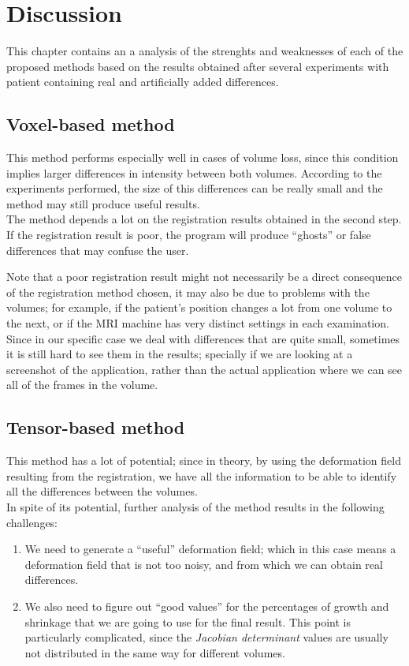 \chapter{Discussion}
This chapter contains an a analysis of the strenghts and weaknesses
of each of the proposed methods based on the results obtained after
several experiments with patient containing real and artificially
added differences.

\section{Voxel-based method}
This method performs especially well in cases of volume loss, since
this condition implies larger differences in intensity between both
volumes. According to the experiments performed, the size of this
differences can be really small and the method may still produce
useful results.\\

The method depends a lot on the registration results obtained in the
second step. If the registration result is poor, the program will
produce ``ghosts'' or false differences that may confuse the user.

Note that a poor registration result might not necessarily be a direct
consequence of the registration method chosen, it may also be due to
problems with the volumes; for example, if the patient's position
changes a lot from one volume to the next, or if the MRI machine has
very distinct settings in each examination.\\

Since in our specific case we deal with differences that are quite
small, sometimes it is still hard to see them in the results;
specially if we are looking at a screenshot of the application, rather
than the actual application where we can see all of the frames in the
volume.

\section{Tensor-based method}
This method has a lot of potential; since in theory, by using the
deformation field resulting from the registration, we have all the
information to be able to identify all the differences between the
volumes.\\

In spite of its potential, further analysis of the method results in
the following challenges:
\begin{enumerate}
\item We need to generate a ``useful'' deformation field; which in
  this case means a deformation field that is not too noisy, and from
  which we can obtain real differences.
\item We also need to figure out ``good values'' for the percentages
  of growth and shrinkage that we are going to use for the final
  result. This point is particularly complicated, since the
  \textit{Jacobian determinant} values are usually not distributed in
  the same way for different volumes.\\
\end{enumerate}

